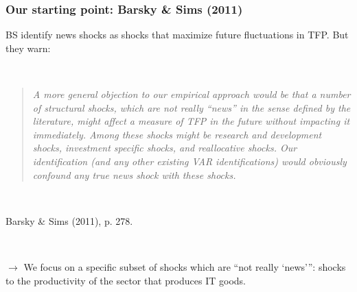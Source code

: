 \documentclass{beamer}
\begin{document}
\begin{frame}
	\frametitle{Our starting point: Barsky \& Sims (2011)}
	\label{BS_quote}

BS identify news shocks as shocks that maximize future fluctuations in TFP. But they warn:
	
	\
	
\blockquote{\emph{A more general objection to our empirical approach would be that a number of structural shocks, which are not really ``news'' in the sense defined by the literature, might affect a measure of TFP in the future without impacting it immediately. Among these shocks might be research and development shocks, investment specific shocks, and reallocative shocks. Our identification (and any other existing VAR identifications) would obviously confound any true news shock with these shocks.}}

\

\hspace{5cm} Barsky \& Sims (2011), p. 278.

\

$\rightarrow$ We focus on a specific subset of shocks which are ``not really `news''': shocks to the productivity of the sector that produces IT goods.
	

\end{frame}
\end{document}
